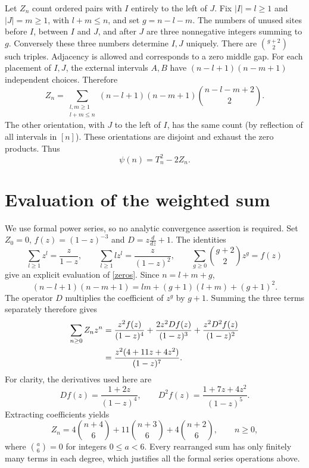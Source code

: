 \documentclass[11pt]{article}
\begin{document}
Let $Z_n$ count ordered pairs with $I$ entirely to the left of $J$.
Fix $|I|=l\ge1$ and $|J|=m\ge1$, with $l+m\le n$, and set
$g=n-l-m$. The numbers of unused sites before $I$, between $I$ and $J$,
and after $J$ are three nonnegative integers summing to $g$.
Conversely these three numbers determine $I,J$ uniquely. There are
$\binom{g+2}{2}$ such triples. Adjacency is allowed and corresponds to
a zero middle gap. For each placement of $I,J$, the external intervals
$A,B$ have $(n-l+1)(n-m+1)$ independent choices. Therefore
\begin{equation}\label{zeros}
 Z_n=\sum_{\substack{l,m\ge1\\l+m\le n}}
 (n-l+1)(n-m+1)\binom{n-l-m+2}{2}.
\end{equation}
The other orientation, with $J$ to the left of $I$, has the same count
(by reflection of all intervals in $[n]$). These orientations are
disjoint and exhaust the zero products. Thus
\begin{equation}\label{complement}
 \psi(n)=T_n^2-2Z_n.
\end{equation}

\section*{Evaluation of the weighted sum}
We use formal power series, so no analytic convergence assertion is
required. Set $Z_0=0$, $f(z)=(1-z)^{-3}$ and
$D=z\frac{d}{dz}+1$. The identities
\[
 \sum_{l\ge1}z^l=\frac z{1-z},\qquad
 \sum_{l\ge1}lz^l=\frac z{(1-z)^2},\qquad
 \sum_{g\ge0}\binom{g+2}{2}z^g=f(z)
\]
give an explicit evaluation of \eqref{zeros}. Since $n=l+m+g$,
\[
 (n-l+1)(n-m+1)=lm+(g+1)(l+m)+(g+1)^2.
\]
The operator $D$ multiplies the coefficient of $z^g$ by $g+1$.
Summing the three terms separately therefore gives
\begin{align}\label{gf}
 \sum_{n\ge0}Z_nz^n
 &=\frac{z^2f(z)}{(1-z)^4}
   +\frac{2z^2Df(z)}{(1-z)^3}
   +\frac{z^2D^2f(z)}{(1-z)^2}\notag\\
 &=\frac{z^2(4+11z+4z^2)}{(1-z)^7}.
\end{align}
For clarity, the derivatives used here are
\[
 Df(z)=\frac{1+2z}{(1-z)^4},\qquad
 D^2f(z)=\frac{1+7z+4z^2}{(1-z)^5}.
\]
Extracting coefficients yields
\begin{equation}\label{zclosed}
 Z_n=4\binom{n+4}{6}+11\binom{n+3}{6}+4\binom{n+2}{6},
 \qquad n\ge0,
\end{equation}
where $\binom a6=0$ for integers $0\le a<6$.
Every rearranged sum has only finitely many terms in each degree,
which justifies all the formal series operations above.
\end{document}
